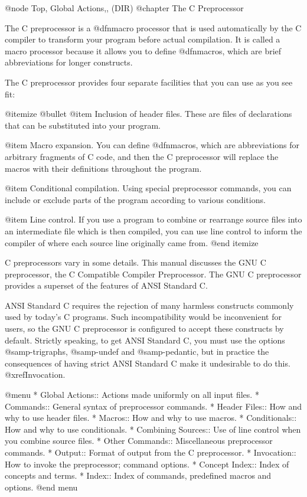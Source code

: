 @node Top, Global Actions,, (DIR)
@chapter The C Preprocessor

The C preprocessor is a @dfn{macro processor} that is used automatically by
the C compiler to transform your program before actual compilation.  It is
called a macro processor because it allows you to define @dfn{macros},
which are brief abbreviations for longer constructs.

The C preprocessor provides four separate facilities that you can use as
you see fit:

@itemize @bullet
@item
Inclusion of header files.  These are files of declarations that can be
substituted into your program.

@item
Macro expansion.  You can define @dfn{macros}, which are abbreviations
for arbitrary fragments of C code, and then the C preprocessor will
replace the macros with their definitions throughout the program.

@item
Conditional compilation.  Using special preprocessor commands, you
can include or exclude parts of the program according to various
conditions.

@item
Line control.  If you use a program to combine or rearrange source files into
an intermediate file which is then compiled, you can use line control
to inform the compiler of where each source line originally came from.
@end itemize

C preprocessors vary in some details.  This manual discusses the GNU C
preprocessor, the C Compatible Compiler Preprocessor.  The GNU C
preprocessor provides a superset of the features of ANSI Standard C.

ANSI Standard C requires the rejection of many harmless constructs commonly
used by today's C programs.  Such incompatibility would be inconvenient for
users, so the GNU C preprocessor is configured to accept these constructs
by default.  Strictly speaking, to get ANSI Standard C, you must use the
options @samp{-trigraphs}, @samp{-undef} and @samp{-pedantic}, but in
practice the consequences of having strict ANSI Standard C make it
undesirable to do this.  @xref{Invocation}.

@menu
* Global Actions::    Actions made uniformly on all input files.
* Commands::          General syntax of preprocessor commands.
* Header Files::      How and why to use header files.
* Macros::            How and why to use macros.
* Conditionals::      How and why to use conditionals.
* Combining Sources:: Use of line control when you combine source files.
* Other Commands::    Miscellaneous preprocessor commands.
* Output::            Format of output from the C preprocessor.
* Invocation::        How to invoke the preprocessor; command options.
* Concept Index::     Index of concepts and terms.
* Index::             Index of commands, predefined macros and options.
@end menu

